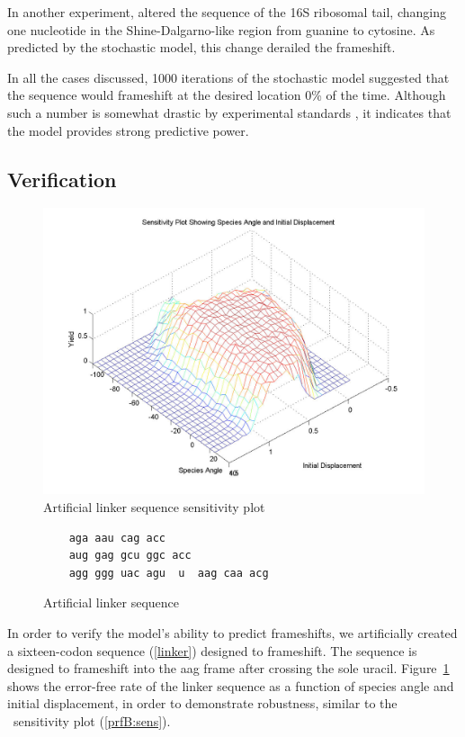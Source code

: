 \documentclass[12pt, draft]{article}
\numberwithin{equation}{section}
\begin{document}
In another experiment, \citeauthor{weiss88} altered the sequence of the
16S ribosomal tail, changing one nucleotide in the Shine-Dalgarno-like region
from guanine to cytosine.  As predicted by the stochastic model, this
change derailed the frameshift.

In all the cases discussed, 1000 iterations of the stochastic model
suggested that the sequence would frameshift at the desired location 0\%
of the time.  Although such a number is somewhat drastic by experimental
standards \cite{weiss87,weiss88}, it indicates that the model provides
strong predictive power.

\subsection{Verification}

\begin{figure}
  \centering
  \caption{Artificial linker sequence sensitivity plot}
  \label{linker:sens}
  \includegraphics[scale=0.25]{linker/sensitivity}
\end{figure}

\begin{figure}
  \caption{Artificial linker sequence}
  \label{linker}
  \begin{verbatim}
    aga aau cag acc
    aug gag gcu ggc acc
    agg ggg uac agu  u  aag caa acg
  \end{verbatim}
\end{figure}

In order to verify the model's ability to predict frameshifts, we
artificially created a sixteen-codon sequence (\autoref{linker})
designed to frameshift.  The sequence is designed to frameshift into
the aag frame after crossing the sole uracil.  Figure~\ref{linker:sens}
shows the error-free rate of the linker sequence as a function of species
angle and initial displacement, in order to demonstrate robustness,
similar to the \prfB\ sensitivity plot (\autoref{prfB:sens}).
\end{document}
